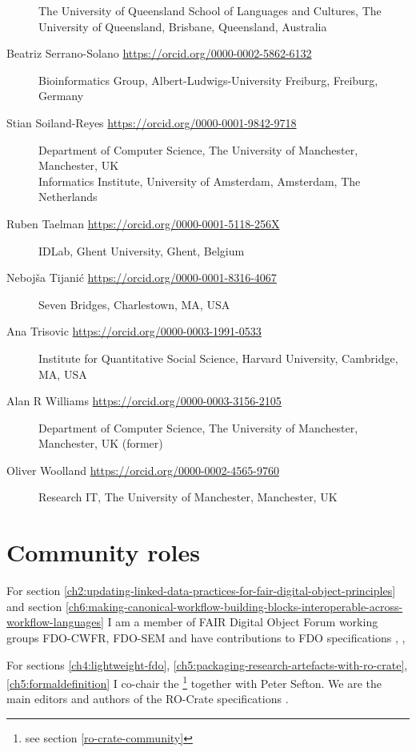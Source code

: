 \begin{description}
The University of Queensland School of Languages and Cultures, The
University of Queensland, Brisbane, Queensland, Australia
\item[Beatriz Serrano-Solano
\url{https://orcid.org/0000-0002-5862-6132}]
Bioinformatics Group, Albert-Ludwigs-University Freiburg, Freiburg,
Germany
\item[Stian Soiland-Reyes \url{https://orcid.org/0000-0001-9842-9718}]
Department of Computer Science, The University of Manchester,
Manchester, UK\\
Informatics Institute, University of Amsterdam, Amsterdam, The
Netherlands
\item[Ruben Taelman \url{https://orcid.org/0000-0001-5118-256X}]
IDLab, Ghent University, Ghent, Belgium
\item[Nebojša Tijanić \url{https://orcid.org/0000-0001-8316-4067}]
Seven Bridges, Charlestown, MA, USA
\item[Ana Trisovic \url{https://orcid.org/0000-0003-1991-0533}]
Institute for Quantitative Social Science, Harvard University,
Cambridge, MA, USA
\item[Alan R Williams \url{https://orcid.org/0000-0003-3156-2105}] 
Department of Computer Science, The University of Manchester,
Manchester, UK (former)
\item[Oliver Woolland \url{https://orcid.org/0000-0002-4565-9760}]
Research IT, The University of Manchester, Manchester, UK
\end{description}


\section{Community roles}

For section \ref{ch2:updating-linked-data-practices-for-fair-digital-object-principles} and section \ref{ch6:making-canonical-workflow-building-blocks-interoperable-across-workflow-languages} I am a member of FAIR Digital Object Forum \cite{FAIRDigitalObjects} working groups FDO-CWFR, FDO-SEM and have contributions to FDO specifications \cite{fdo-RequirementSpec}, \cite{fdo-Overview}, 

For sections \ref{ch4:lightweight-fdo}, \ref{ch5:packaging-research-artefacts-with-ro-crate},  \ref{ch5:formaldefinition} I co-chair the
\footnote{see section \vref{ro-crate-community}} together with Peter Sefton. We are the main editors and authors of the RO-Crate specifications \cite{ch5-105,ch5-107,rocrate1.1}.

